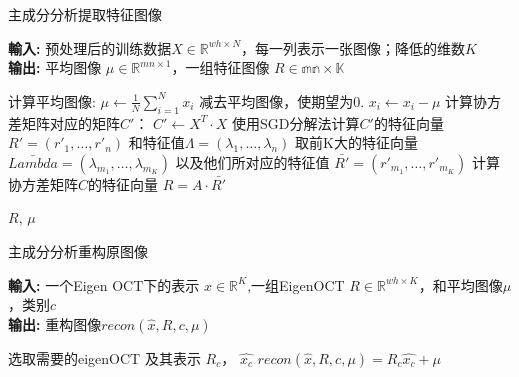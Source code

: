         \begin{algorithm}[t]
        \label{alg: eigenOCT}
        \caption{主成分分析提取特征图像} %
        \hspace*{0.02in} {\bf 輸入:} %
        预处理后的训练数据$X \in \mathbb{R}^{wh \times N}$，每一列表示一张图像；降低的维数$K$ \\
        \hspace*{0.02in} {\bf 输出:} %
        平均图像 $\mu \in \mathbb{R}^{mn\times 1}$，一组特征图像 $R \in \mathbb {mn \times K}$
        \begin{algorithmic}[1]
        \State 计算平均图像: $\mu \leftarrow \frac{1}{N} \sum_{i=1}^N x_i$ %
        \State 减去平均图像，使期望为0. $x_i \leftarrow x_i - \mu$
        \State 计算协方差矩阵对应的矩阵$C'$： $C' \leftarrow X^T \cdot X$
        \State 使用SGD分解法计算$C'$的特征向量 $R' = (r'_1, \dots, r'_n)$ 和特征值$\Lambda = (\lambda_1, \dots, \lambda_n)$
        \State 取前K大的特征向量 $\bar{Lambda} = (\lambda_{m_1}, \dots, \lambda_{m_K})$ 以及他们所对应的特征值 $\bar {R'} = (r'_{m_1}, \dots, r'_{m_K})$
        \State 计算协方差矩阵$C$的特征向量 $R = A \cdot \bar{R'}$

        \State \Return $R$, $\mu$
        \end{algorithmic}
        \end {algorithm}

        \begin{algorithm}[t]
        \label{alg: pca_recon}
        \caption{主成分分析重构原图像} %
        \hspace*{0.02in} {\bf 輸入:} %
        一个Eigen OCT下的表示 $\hat{x} \in \mathbb{R} ^{K} $,一组EigenOCT $R \in \mathbb{R} ^{wh \times K}$，和平均图像$\mu$，类别$c$\\
        \hspace*{0.02in} {\bf 输出:} %
        重构图像$recon(\hat{x}, R, c, \mu)$
        \begin{algorithmic}[1]
            \State 选取需要的eigenOCT 及其表示 $R_c$， $\hat{x_c}$
            \State $recon(\hat{x}, R, c, \mu) = R_c \hat{x_c} + \mu$
        \end{algorithmic}
        \end {algorithm}



